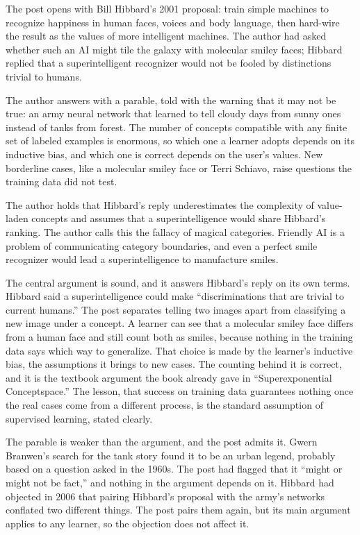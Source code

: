\begin{afterword}
\summaryhead

The post opens with Bill Hibbard's 2001 proposal: train simple machines to recognize happiness in human faces, voices and body language, then hard-wire the result as the values of more intelligent machines. The author had asked whether such an AI might tile the galaxy with molecular smiley faces; Hibbard replied that a superintelligent recognizer would not be fooled by distinctions trivial to humans.

The author answers with a parable, told with the warning that it may not be true: an army neural network that learned to tell cloudy days from sunny ones instead of tanks from forest. The number of concepts compatible with any finite set of labeled examples is enormous, so which one a learner adopts depends on its inductive bias, and which one is correct depends on the user's values. New borderline cases, like a molecular smiley face or Terri Schiavo, raise questions the training data did not test.

The author holds that Hibbard's reply underestimates the complexity of value-laden concepts and assumes that a superintelligence would share Hibbard's ranking. The author calls this the fallacy of magical categories. Friendly AI is a problem of communicating category boundaries, and even a perfect smile recognizer would lead a superintelligence to manufacture smiles.

\responsehead

The central argument is sound, and it answers Hibbard's reply on its own terms. Hibbard said a superintelligence could make ``discriminations that are trivial to current humans.'' The post separates telling two images apart from classifying a new image under a concept. A learner can see that a molecular smiley face differs from a human face and still count both as smiles, because nothing in the training data says which way to generalize. That choice is made by the learner's inductive bias, the assumptions it brings to new cases. The counting behind it is correct, and it is the textbook argument the book already gave in ``Superexponential Conceptspace.'' The lesson, that success on training data guarantees nothing once the real cases come from a different process, is the standard assumption of supervised learning, stated clearly.

The parable is weaker than the argument, and the post admits it. Gwern Branwen's search for the tank story found it to be an urban legend, probably based on a question asked in the 1960s. The post had flagged that it ``might or might not be fact,'' and nothing in the argument depends on it. Hibbard had objected in 2006 that pairing Hibbard's proposal with the army's networks conflated two different things. The post pairs them again, but its main argument applies to any learner, so the objection does not affect it.


\end{afterword}
